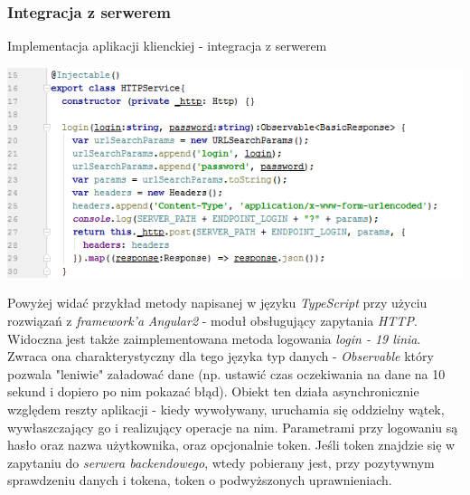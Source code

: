 \documentclass[10pt,titlepage]{article} %
\begin{document}
\subsubsection{Integracja z serwerem}
\begin{listing}[H]
\caption[Implementacja aplikacji klienckiej - integracja z serwerem]{Implementacja aplikacji klienckiej - integracja z serwerem}
\includegraphics[width=\textwidth]{img/sekcja3/frontend/logowanieRequest}
\end{listing}

Powyżej widać przykład metody napisanej w języku \textit{TypeScript} przy użyciu rozwiązań z \textit{framework'a} \textit{Angular2} - moduł obsługujący zapytania \textit{HTTP}. Widoczna jest także zaimplementowana metoda logowania \textit{login - 19 linia}. Zwraca ona charakterystyczny dla tego języka typ danych - \textit{Observable} który pozwala "leniwie" załadować dane (np. ustawić czas oczekiwania na dane na 10 sekund i dopiero po nim pokazać błąd). Obiekt ten działa asynchronicznie względem reszty aplikacji - kiedy wywoływany, uruchamia się oddzielny wątek, wywłaszczający go i realizujący operacje na nim. Parametrami przy logowaniu są hasło oraz nazwa użytkownika, oraz opcjonalnie token. Jeśli token znajdzie się w zapytaniu do \textit{serwera backendowego}, wtedy pobierany jest, przy pozytywnym sprawdzeniu danych i tokena, token o podwyższonych uprawnieniach.
\end{document}
